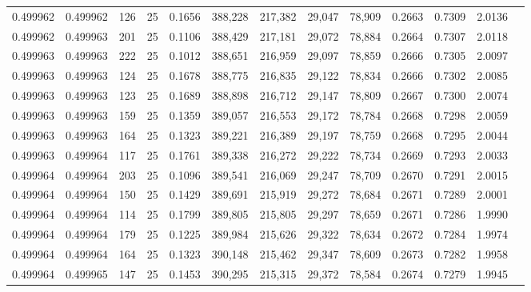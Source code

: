 \begin{tabular}{rrrrrrrrrrrrr}
0.499962 & 0.499962 &   126 &  25 &                                     0.1656 & 388,228 & 217,382 &  29,047 &  78,909 & 0.2663 & 0.7309 & 2.0136 \\
0.499962 & 0.499963 &   201 &  25 &                                     0.1106 & 388,429 & 217,181 &  29,072 &  78,884 & 0.2664 & 0.7307 & 2.0118 \\
0.499963 & 0.499963 &   222 &  25 &                                     0.1012 & 388,651 & 216,959 &  29,097 &  78,859 & 0.2666 & 0.7305 & 2.0097 \\
0.499963 & 0.499963 &   124 &  25 &                                     0.1678 & 388,775 & 216,835 &  29,122 &  78,834 & 0.2666 & 0.7302 & 2.0085 \\
0.499963 & 0.499963 &   123 &  25 &                                     0.1689 & 388,898 & 216,712 &  29,147 &  78,809 & 0.2667 & 0.7300 & 2.0074 \\
0.499963 & 0.499963 &   159 &  25 &                                     0.1359 & 389,057 & 216,553 &  29,172 &  78,784 & 0.2668 & 0.7298 & 2.0059 \\
0.499963 & 0.499963 &   164 &  25 &                                     0.1323 & 389,221 & 216,389 &  29,197 &  78,759 & 0.2668 & 0.7295 & 2.0044 \\
0.499963 & 0.499964 &   117 &  25 &                                     0.1761 & 389,338 & 216,272 &  29,222 &  78,734 & 0.2669 & 0.7293 & 2.0033 \\
0.499964 & 0.499964 &   203 &  25 &                                     0.1096 & 389,541 & 216,069 &  29,247 &  78,709 & 0.2670 & 0.7291 & 2.0015 \\
0.499964 & 0.499964 &   150 &  25 &                                     0.1429 & 389,691 & 215,919 &  29,272 &  78,684 & 0.2671 & 0.7289 & 2.0001 \\
0.499964 & 0.499964 &   114 &  25 &                                     0.1799 & 389,805 & 215,805 &  29,297 &  78,659 & 0.2671 & 0.7286 & 1.9990 \\
0.499964 & 0.499964 &   179 &  25 &                                     0.1225 & 389,984 & 215,626 &  29,322 &  78,634 & 0.2672 & 0.7284 & 1.9974 \\
0.499964 & 0.499964 &   164 &  25 &                                     0.1323 & 390,148 & 215,462 &  29,347 &  78,609 & 0.2673 & 0.7282 & 1.9958 \\
0.499964 & 0.499965 &   147 &  25 &                                     0.1453 & 390,295 & 215,315 &  29,372 &  78,584 & 0.2674 & 0.7279 & 1.9945 \\

\end{tabular}
